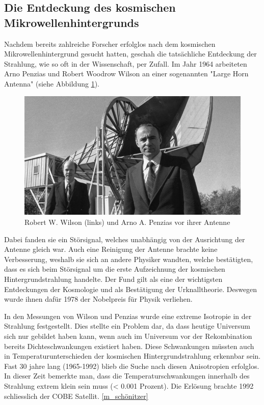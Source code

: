 	\subsection{Die Entdeckung des kosmischen Mikrowellenhintergrunds}
	Nachdem bereits zahlreiche Forscher erfolglos nach dem kosmischen Mikrowellenhintergrund gesucht hatten, geschah die tatsächliche Entdeckung der Strahlung, wie so oft in der Wissenschaft, per Zufall.
	Im Jahr 1964 arbeiteten Arno Penzias und Robert Woodrow Wilson an einer sogenannten "Large Horn Antenna" (siehe Abbildung \ref{fig:wilson_penzias}).
	\begin{figure}
		\includegraphics[scale=1]{cmb/images/penzias-wilson-large-horn-antenna.jpg}
		\caption{Robert W. Wilson (links) und Arno A. Penzias vor ihrer Antenne}
		\label{fig:wilson_penzias}
	\end{figure}
	Dabei fanden sie ein Störsignal, welches unabhängig von der Ausrichtung der Antenne gleich war.
	Auch eine Reinigung der Antenne brachte keine Verbesserung, weshalb sie sich an andere Physiker wandten, welche bestätigten, dass es sich beim Störsignal um die erste Aufzeichnung der kosmischen Hintergrundstrahlung handelte.
	Der Fund gilt als eine der wichtigsten Entdeckungen der Kosmologie und als Bestätigung der Urknalltheorie.
	Deswegen wurde ihnen dafür 1978 der Nobelpreis für Physik verliehen.
	
	In den Messungen von Wilson und Penzias wurde eine extreme Isotropie in der Strahlung festgestellt.
	Dies stellte ein Problem dar, da dass heutige Universum sich nur gebildet haben kann, wenn auch im Universum vor der Rekombination bereits Dichteschwankungen existiert haben.
	Diese Schwankungen müssten auch in Temperaturunterschieden der kosmischen Hintergrundstrahlung erkennbar sein.
	Fast 30 jahre lang (1965-1992) blieb die Suche nach diesen Anisotropien erfolglos.
	In dieser Zeit bemerkte man, dass die Temperaturschwankungen innerhalb des Strahlung extrem klein sein muss (< 0.001 Prozent).
	Die Erlösung brachte 1992 schliesslich der COBE Satellit.
	\ref{m_schönitzer}
	
